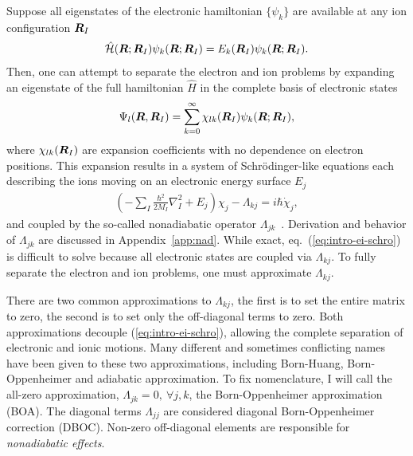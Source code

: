 Suppose all eigenstates of the electronic hamiltonian $\{\psi_k\}$ are available at any ion configuration $\boldsymbol{R}_I$
\begin{align}
\hat{\mathcal{H}} (\boldsymbol{R};\boldsymbol{R}_I) \psi_k(\boldsymbol{R};\boldsymbol{R}_I) = E_k(\boldsymbol{R}_I) \psi_k(\boldsymbol{R};\boldsymbol{R}_I).
\end{align}
Then, one can attempt to separate the electron and ion problems by expanding an eigenstate of the full hamiltonian $\hat{H}$ in the complete basis of electronic states
\begin{align}
\Psi_l(\boldsymbol{R},\boldsymbol{R}_I) = \sum_{k=0}^\infty \chi_{lk}(\boldsymbol{R}_I)\psi_k(\boldsymbol{R};\boldsymbol{R}_I),
\end{align}
where $\chi_{lk}(\boldsymbol{R}_I)$ are expansion coefficients with no dependence on electron positions. This expansion results in a system of Schr\"odinger-like equations each describing the ions moving on an electronic energy surface $E_j$
\begin{align} \label{eq:intro-ei-schro}
\left(-\sum_I\frac{\hbar^2}{2M_I}\nabla^2_I+E_j\right)\chi_j - \Lambda_{kj} = i\hbar\dot{\chi}_j,
\end{align}
and coupled by the so-called nonadiabatic operator $\Lambda_{jk}$~\cite{Worth2004}.
Derivation and behavior of $\Lambda_{jk}$ are discussed in Appendix~\ref{app:nad}.
While exact, eq.~(\ref{eq:intro-ei-schro}) is difficult to solve because all electronic states are coupled via $\Lambda_{kj}$.
To fully separate the electron and ion problems, one must approximate $\Lambda_{kj}$.

There are two common approximations to $\Lambda_{kj}$, the first is to set the entire matrix to zero, the second is to set only the off-diagonal terms to zero. Both approximations decouple (\ref{eq:intro-ei-schro}), allowing the complete separation of electronic and ionic motions.
Many different and sometimes conflicting names have been given to these two approximations, including Born-Huang, Born-Oppenheimer and adiabatic approximation.
To fix nomenclature, I will call the all-zero approximation, $\Lambda_{jk}=0,~\forall j, k$, the Born-Oppenheimer approximation (BOA).
The diagonal terms $\Lambda_{jj}$ are considered diagonal Born-Oppenheimer correction (DBOC).
Non-zero off-diagonal elements are responsible for \textit{nonadiabatic effects}.


